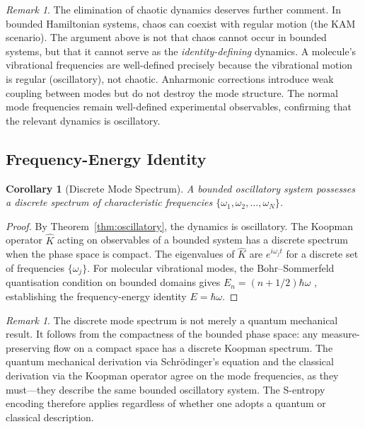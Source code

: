 \documentclass[11pt,a4paper]{article}
\newtheorem{corollary}[theorem]{Corollary}
\theoremstyle{definition}
\theoremstyle{remark}
\newtheorem{remark}[theorem]{Remark}
\begin{document}
\begin{remark}
The elimination of chaotic dynamics deserves further comment. In bounded Hamiltonian systems, chaos can coexist with regular motion (the KAM scenario). The argument above is not that chaos cannot occur in bounded systems, but that it cannot serve as the \emph{identity-defining} dynamics. A molecule's vibrational frequencies are well-defined precisely because the vibrational motion is regular (oscillatory), not chaotic. Anharmonic corrections introduce weak coupling between modes but do not destroy the mode structure. The normal mode frequencies remain well-defined experimental observables, confirming that the relevant dynamics is oscillatory.
\end{remark}

\subsection{Frequency-Energy Identity}

\begin{corollary}[Discrete Mode Spectrum]
\label{cor:discrete}
A bounded oscillatory system possesses a discrete spectrum of characteristic frequencies $\{\omega_1, \omega_2, \ldots, \omega_N\}$.
\end{corollary}

\begin{proof}
By Theorem~\ref{thm:oscillatory}, the dynamics is oscillatory. The Koopman operator $\hat{K}$ \citep{koopman1931} acting on observables of a bounded system has a discrete spectrum when the phase space is compact. The eigenvalues of $\hat{K}$ are $e^{i\omega_j t}$ for a discrete set of frequencies $\{\omega_j\}$. For molecular vibrational modes, the Bohr--Sommerfeld quantisation condition on bounded domains gives $E_n = (n + 1/2)\hbar\omega$ \citep{bohr1913}, establishing the frequency-energy identity $E = \hbar\omega$.
\end{proof}

\begin{remark}
The discrete mode spectrum is not merely a quantum mechanical result. It follows from the compactness of the bounded phase space: any measure-preserving flow on a compact space has a discrete Koopman spectrum. The quantum mechanical derivation via Schr\"odinger's equation and the classical derivation via the Koopman operator agree on the mode frequencies, as they must---they describe the same bounded oscillatory system. The S-entropy encoding therefore applies regardless of whether one adopts a quantum or classical description.
\end{remark}
\end{document}
